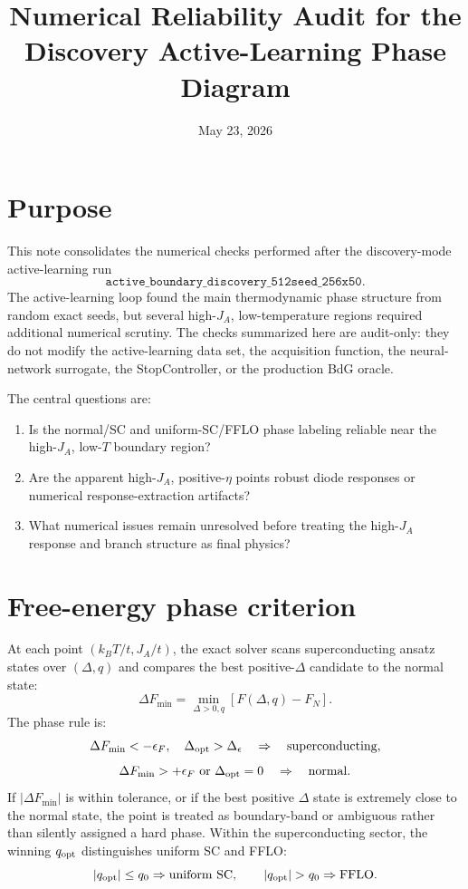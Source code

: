 \documentclass[11pt]{article}
\title{Numerical Reliability Audit for the Discovery Active-Learning Phase Diagram}
\author{}
\date{May 23, 2026}
\begin{document}
\maketitle

\section*{Purpose}

This note consolidates the numerical checks performed after the discovery-mode
active-learning run
\[
\texttt{active\_boundary\_discovery\_512seed\_256x50}.
\]
The active-learning loop found the main thermodynamic phase structure from
random exact seeds, but several high-\(J_A\), low-temperature regions required
additional numerical scrutiny.  The checks summarized here are audit-only:
they do not modify the active-learning data set, the acquisition function, the
neural-network surrogate, the StopController, or the production BdG oracle.

The central questions are:

\begin{enumerate}
  \item Is the normal/SC and uniform-SC/FFLO phase labeling reliable near the
        high-\(J_A\), low-\(T\) boundary region?
  \item Are the apparent high-\(J_A\), positive-\(\eta\) points robust diode
        responses or numerical response-extraction artifacts?
  \item What numerical issues remain unresolved before treating the high-\(J_A\)
        response and branch structure as final physics?
\end{enumerate}

\section*{Free-energy phase criterion}

At each point \((k_B T/t,J_A/t)\), the exact solver scans superconducting
ansatz states over \((\Delta,q)\) and compares the best positive-\(\Delta\)
candidate to the normal state:
\[
\Delta F_{\min}
= \min_{\Delta>0,q}\left[F(\Delta,q)-F_N\right].
\]
The phase rule is:
\[
\Delta F_{\min} < -\epsilon_F,\quad \Delta_{\rm opt}>\Delta_\epsilon
\quad \Rightarrow\quad \text{superconducting},
\]
\[
\Delta F_{\min} > +\epsilon_F \ \text{or}\ \Delta_{\rm opt}=0
\quad \Rightarrow\quad \text{normal}.
\]
If \(|\Delta F_{\min}|\) is within tolerance, or if the best positive
\(\Delta\) state is extremely close to the normal state, the point is treated
as boundary-band or ambiguous rather than silently assigned a hard phase.
Within the superconducting sector, the winning \(q_{\rm opt}\) distinguishes
uniform SC and FFLO:
\[
|q_{\rm opt}|\le q_0 \Rightarrow \text{uniform SC}, \qquad
|q_{\rm opt}|>q_0 \Rightarrow \text{FFLO}.
\]
\end{document}
